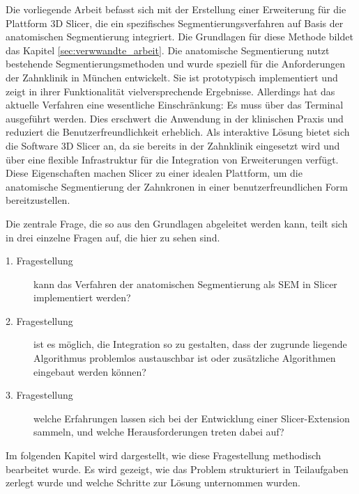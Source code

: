 Die vorliegende Arbeit befasst sich mit der Erstellung einer Erweiterung für die
Plattform 3D Slicer, die ein spezifisches Segmentierungsverfahren auf Basis der
anatomischen Segmentierung integriert. Die Grundlagen für diese Methode bildet das
Kapitel \ref{sec:verwwandte_arbeit}. Die anatomische Segmentierung nutzt
bestehende Segmentierungsmethoden und wurde speziell für die Anforderungen der
Zahnklinik in München entwickelt. Sie ist prototypisch implementiert und zeigt in
ihrer Funktionalität vielversprechende Ergebnisse. Allerdings hat das aktuelle
Verfahren eine wesentliche Einschränkung: Es muss über das Terminal ausgeführt werden.
Dies erschwert die Anwendung in der klinischen Praxis und reduziert die
Benutzerfreundlichkeit erheblich. Als interaktive Lösung bietet sich die Software
3D Slicer an, da sie bereits in der Zahnklinik eingesetzt wird und über eine
flexible Infrastruktur für die Integration von Erweiterungen verfügt. Diese Eigenschaften
machen Slicer zu einer idealen Plattform, um die anatomische Segmentierung der
Zahnkronen in einer benutzerfreundlichen Form bereitzustellen.

Die zentrale Frage, die so aus den Grundlagen abgeleitet werden kann, teilt sich
in drei einzelne Fragen auf, die hier zu sehen sind.

\begin{description}
	\item[1. Fragestellung] kann das Verfahren der anatomischen Segmentierung als \ac{SEM}
		in Slicer implementiert werden?

	\item[2. Fragestellung] ist es möglich, die Integration so zu gestalten, dass der
		zugrunde liegende Algorithmus problemlos austauschbar ist oder zusätzliche Algorithmen
		eingebaut werden können?

	\item[3. Fragestellung] welche Erfahrungen lassen sich bei der Entwicklung einer
		Slicer-Extension sammeln, und welche Herausforderungen treten dabei auf?
\end{description}

Im folgenden Kapitel wird dargestellt, wie diese Fragestellung methodisch bearbeitet
wurde. Es wird gezeigt, wie das Problem strukturiert in Teilaufgaben zerlegt wurde
und welche Schritte zur Lösung unternommen wurden.

